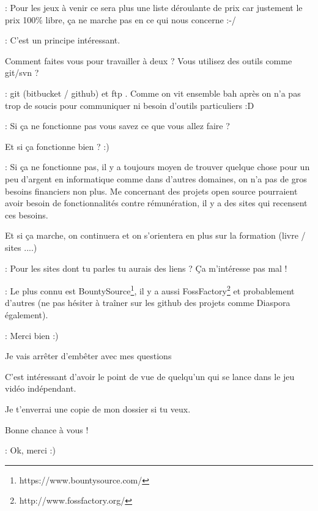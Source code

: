 \documentclass[a4paper,12pt, draft]{report}
\begin{document}
\begin{description}
\item 
\item [Réponse]: Pour les jeux à venir ce sera plus une liste déroulante de prix car justement le prix 100\% libre, ça ne marche pas en ce qui nous concerne :-/
\item 
\item [Question]: C'est un principe intéressant.
\item Comment faites vous pour travailler à deux ? Vous utilisez des outils comme git/svn ?
\item 
\item [Réponse]: git (bitbucket / github) et ftp  . Comme on vit ensemble bah après on n'a pas trop de soucis pour communiquer ni besoin d'outils particuliers :D
\item 
\item [Question]: Si ça ne fonctionne pas vous savez ce que vous allez faire ?
\item Et si ça fonctionne bien ? :)
\item 
\item [Réponse]: Si ça ne fonctionne pas, il y a toujours moyen de trouver quelque chose pour un peu d'argent en informatique comme dans d'autres domaines, on n'a pas de gros besoins financiers non plus. Me concernant des projets open source pourraient avoir besoin de fonctionnalités contre rémunération, il y a des sites qui recensent ces besoins.
\item Et si ça marche, on continuera et on s'orientera en plus sur la formation (livre / sites ....)
\item 
\item [Question]: Pour les sites dont tu parles tu aurais des liens ? Ça m'intéresse pas mal !
\item 
\item [Réponse]: Le plus connu est BountySource\footnote{https://www.bountysource.com/}, il y a aussi FossFactory\footnote{http://www.fossfactory.org/} et probablement d'autres (ne pas hésiter à traîner sur les github des projets comme Diaspora également).
\item 
\item [Question]: Merci bien :)
\item Je vais arrêter d'embêter avec mes questions  
\item C'est intéressant d'avoir le point de vue de quelqu'un qui se lance dans le jeu vidéo indépendant.
\item Je t'enverrai une copie de mon dossier si tu veux.
\item Bonne chance à vous !
\item 
\item [Réponse]: Ok, merci :)

\end{description}
\end{document}
